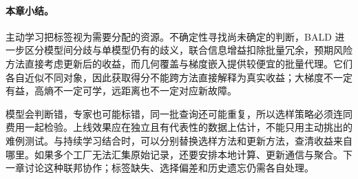 \paragraph{本章小结。}
主动学习把标签视为需要分配的资源。不确定性寻找尚未确定的判断，BALD 进一步区分模型间分歧与单模型仍有的歧义，联合信息增益扣除批量冗余，预期风险方法直接考虑更新后的收益，而几何覆盖与梯度嵌入提供较便宜的批量代理。它们各自近似不同对象，因此获取得分不能跨方法直接解释为真实收益；大梯度不一定有益，高熵不一定可学，远距离也不一定对应新故障。

模型会判断错，专家也可能标错，同一批查询还可能重复，所以选样策略必须连同费用一起检验。上线效果应在独立且有代表性的数据上估计，不能只用主动挑出的难例测试。与持续学习结合时，可以分别替换选样方法和更新方法，查清收益来自哪里。如果多个工厂无法汇集原始记录，还要安排本地计算、更新通信与聚合。下一章讨论这种联邦协作；标签缺失、选择偏差和历史遗忘仍需各自处理。
